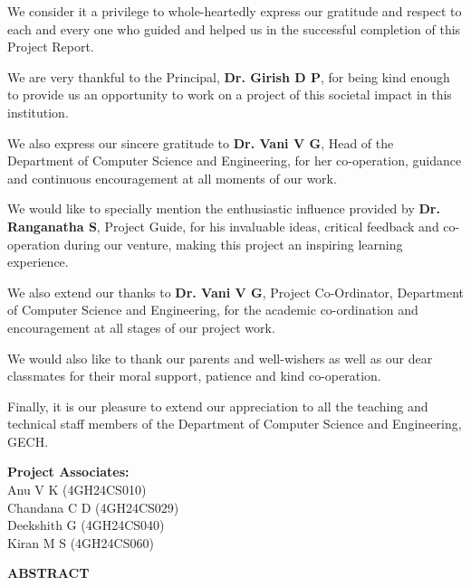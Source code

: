 \documentclass[12pt,a4paper]{report}
\begin{document}
We consider it a privilege to whole-heartedly express our gratitude and respect to each and every one who guided and helped us in the successful completion of this Project Report.

We are very thankful to the Principal, \textbf{Dr. Girish D P}, for being kind enough to provide us an opportunity to work on a project of this societal impact in this institution.

We also express our sincere gratitude to \textbf{Dr. Vani V G}, Head of the Department of Computer Science and Engineering, for her co-operation, guidance and continuous encouragement at all moments of our work.

We would like to specially mention the enthusiastic influence provided by \textbf{Dr. Ranganatha S}, Project Guide, for his invaluable ideas, critical feedback and co-operation during our venture, making this project an inspiring learning experience.

We also extend our thanks to \textbf{Dr. Vani V G}, Project Co-Ordinator, Department of Computer Science and Engineering, for the academic co-ordination and encouragement at all stages of our project work.

We would also like to thank our parents and well-wishers as well as our dear classmates for their moral support, patience and kind co-operation.

Finally, it is our pleasure to extend our appreciation to all the teaching and technical staff members of the Department of Computer Science and Engineering, GECH.

\vspace{0.8cm}
\hfill \textbf{Project Associates:}\\[0.2cm]
\null \hfill Anu V K (4GH24CS010)\\
\null \hfill Chandana C D (4GH24CS029)\\
\null \hfill Deekshith G (4GH24CS040)\\
\null \hfill Kiran M S (4GH24CS060)
\newpage

\begin{center}
  \textbf{\Large ABSTRACT}\\[0.6cm]
\end{center}
\end{document}
